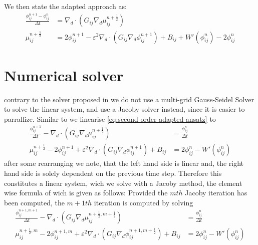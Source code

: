 \documentclass{mimosis}
\begin{document}
We then state the adapted approach as:
\begin{equation}
\label{eq:second-order-adapted-ansatz}
\begin{aligned}
\frac{\phi_{ij}^{n+1} - \phi_{ij}^n}{\Delta t}  &=  \nabla _d \cdot (G_{ij} \nabla_d \mu_{ij}^{n+\frac{1}{2}} )  \\
 \mu_{ij}^{n+\frac{1}{2}} &= 2\phi_{ij}^{n+1} - \varepsilon^2  \nabla_d \cdot  (G_{ij} \nabla _d \phi_{ij}^{n+1} ) + B_{ij} + W'(\phi_{ij}^n) - 2\phi _{ij}^n
\end{aligned}
\end{equation}
\chapter{Numerical solver}
\label{sec:org8a0bb11}
contrary to the solver proposed in\autocite{Ulmer_CHRelaxed_2024} we do not use a multi-grid Gauss-Seidel Solver to solve the linear system, and use a Jacoby solver instead, since it is easier to parrallize.
Similar to \autocite{Ulmer_CHRelaxed_2024} we linearise \eqref{eq:second-order-adapted-ansatz} to
\begin{equation}
\begin{aligned}
\frac{\phi_{ij}^{n+1}}{\Delta t}  -  \nabla _d \cdot (G_{ij} \nabla_d \mu_{ij}^{n+\frac{1}{2}} ) &= \frac{ \phi_{ij}^n}{\Delta t}  \\
 \mu_{ij}^{n+\frac{1}{2}} - 2\phi_{ij}^{n+1} + \varepsilon^2  \nabla_d \cdot  (G_{ij} \nabla _d \phi_{ij}^{n+1} ) + B_{ij} &=2\phi _{ij}^n - W'(\phi_{ij}^n)
\end{aligned}
\end{equation}
after some rearranging we note, that the left hand side is linear and, the right hand side is solely dependent on the previous time step. Therefore this constitutes a linear system, wich we solve with a Jacoby method, the element wise formula of wich is given as follows:
Provided the \(mth\) Jacoby iteration has been computed, the \(m+1th\) iteration is computed by solving
\begin{equation}
\begin{aligned}
\frac{\phi_{ij}^{n+1,m+1}}{\Delta t}  -  \nabla _d \cdot (G_{ij} \nabla_d \mu_{ij}^{n+\frac{1}{2},m+\frac{1}{2}} ) &= \frac{ \phi_{ij}^{n}}{\Delta t}  \\
 \mu_{ij}^{n+\frac{1}{2},m} - 2\phi_{ij}^{n+1,m} + \varepsilon^2  \nabla_d \cdot  (G_{ij} \nabla _d \phi_{ij}^{n+1,m+\frac{1}{2}} ) + B_{ij} &=2\phi _{ij}^n - W'(\phi_{ij}^n)
\end{aligned}
\end{equation}
\end{document}

